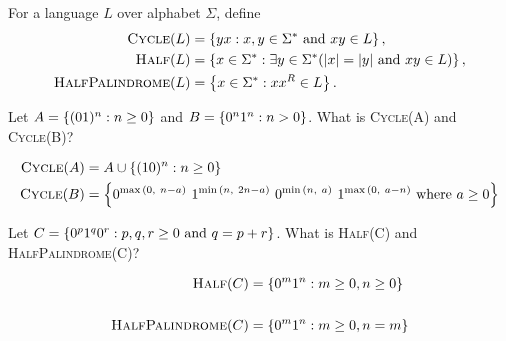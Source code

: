 \begin{problem}
  For a language $L$ over alphabet $\Sigma$, define
  \begin{align*}
    \textsc{Cycle}(L) &= \left\{yx : x, y \in \Sigma^* \text{ and } xy \in L\right\},\\
    \textsc{Half}(L) &= \left\{x \in \Sigma^* : \exists y \in \Sigma^* (\lvert x\rvert = \lvert y\rvert \text{ and } xy \in L)\right\},\\
    \textsc{HalfPalindrome}(L) &= \left\{x \in \Sigma^* : xx^R \in L \right\}.\\
  \end{align*}
  \begin{enumalph}
    \item Let $A = \left\{(01)^n : n \geq 0\right\}$ and $B = \left\{0^n1^n : n > 0\right\}$.
      What is \textsc{Cycle}(A) and \textsc{Cycle}(B)?
      \begin{Answer}
        \begin{align*}
          \textsc{Cycle}(A) &= A \cup \set{(10)^n : n \ge 0}\\
          \textsc{Cycle}(B) &= \set{0^{\max{(0,\ n-a)}}\ 1^{\min{(n,\ 2n - a)}}\ 0^{\min{(n,\ a)}}\ 1^{\max{(0,\ a-n)}} \text{ where $a \ge 0$}}
        \end{align*}
      \end{Answer}

    \item Let $C = \left\{0^p1^q0^r : p, q, r \ge 0 \text{ and } q = p + r\right\}$.
      What is \textsc{Half}(C) and \textsc{HalfPalindrome}(C)?
      \begin{Answer}
        \begin{align*}
          \textsc{Half}(C) &= \left\{0^m1^n : m \ge 0, n \ge 0\right\} \\
          \\
          \textsc{HalfPalindrome}(C) &= \left\{0^m1^n : m \ge 0, n = m\right\} \\
        \end{align*}
        
      \end{Answer}
  \end{enumalph}
\end{problem}

